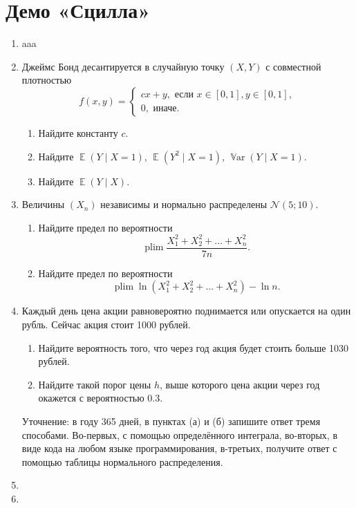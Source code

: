 \documentclass[12pt]{article}
\DeclareMathOperator{\Var}{\mathbb{V}ar}
\DeclareMathOperator{\plim}{plim}
\DeclareMathOperator{\E}{\mathbb{E}}
\newcommand \cN{\mathcal{N}}
\begin{document}
\section*{Демо «Сцилла»}
\begin{enumerate}
\item aaa
\item Джеймс Бонд десантируется в случайную точку $(X, Y)$ с совместной плотностью 
\[
f(x, y) = \begin{cases}
    cx + y, \text{ если } x\in [0, 1], y\in [0, 1], \\
    0, \text{ иначе.}
\end{cases}
\]
\begin{enumerate}
    \item Найдите константу $c$. 
    \item Найдите $\E(Y \mid X = 1)$, $\E(Y^2 \mid X= 1)$, $\Var(Y \mid X = 1)$.
    \item Найдите $\E(Y \mid X)$.
\end{enumerate}

\item Величины $(X_n)$ независимы и нормально распределены $\cN(5; 10)$.

\begin{enumerate}
  \item Найдите предел по вероятности
  \[
  \plim \frac{X_1^2 + X_2^2 + \dots + X_n^2}{7n}.
  \]
  \item Найдите предел по вероятности
  \[
  \plim \ln(X_1^2 + X_2^2 + \dots + X_n^2) - \ln n.
  \]
\end{enumerate}

\item Каждый день цена акции равновероятно поднимается или опускается на один рубль. 
Сейчас акция стоит 1000 рублей.
\begin{enumerate}
    \item Найдите вероятность того, что через год акция будет стоить больше 1030 рублей.
    \item Найдите такой порог цены $h$, выше которого цена акции через год окажется с вероятностью $0.3$.
\end{enumerate}

Уточнение: в году 365 дней, в пунктах (а) и (б) запишите ответ тремя способами.
Во-первых, с помощью определённого интеграла, во-вторых, в виде кода на любом языке программирования, 
в-третьих, получите ответ с помощью таблицы нормального распределения. 

\item 
\item 



\end{enumerate}
\end{document}
